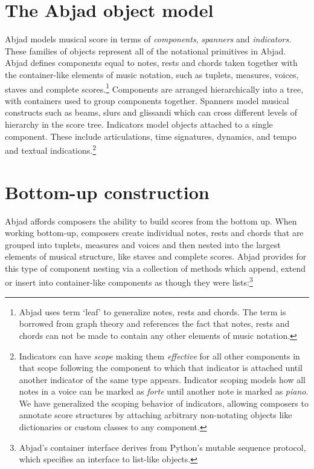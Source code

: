 \documentclass{article}
\begin{document}
\section{The Abjad object model}

Abjad models musical score in terms of \emph{components}, \emph{spanners} and
\emph{indicators}. These families of objects represent all of the notational
primitives in Abjad. Abjad defines components equal to notes, rests and chords
taken together with the container-like elements of music notation, such as
tuplets, measures, voices, staves and complete scores.\footnote{Abjad uses term
`leaf' to generalize notes, rests and chords. The term is borrowed from graph
theory and references the fact that notes, rests and chords can not be made to
contain any other elements of music notation.} Components are arranged
hierarchically into a tree, with containers used to group components
together. Spanners model musical constructs such as beams, slurs
and glissandi which can cross different levels of hierarchy in the score tree.
Indicators model objects attached to a single component. These include
articulations, time signatures, dynamics, and tempo and textual
indications.\footnote{Indicators can have \emph{scope} making them
\emph{effective} for all other components in that scope following the component
to which that indicator is attached until another indicator of the same type
appears. Indicator scoping models how all notes in a voice can be marked as
\emph{forte} until another note is marked as \emph{piano}. We have generalized
the scoping behavior of indicators, allowing composers to annotate score
structures by attaching arbitrary non-notating objects like dictionaries or
custom classes to any component.}

\section{Bottom-up construction} \label{sec:bottom-up}

Abjad affords composers the ability to build scores from the bottom up.
When working bottom-up, composers create individual notes, rests and chords that
are grouped into tuplets, measures and voices and then nested into the
largest elements of musical structure, like staves and complete scores.
Abjad provides for this type of component nesting via a collection of methods which
append, extend or insert into container-like components as though they were lists:\footnote{Abjad's
container interface derives from Python's mutable sequence protocol, which specifies an interface to list-like objects.}
\end{document}
